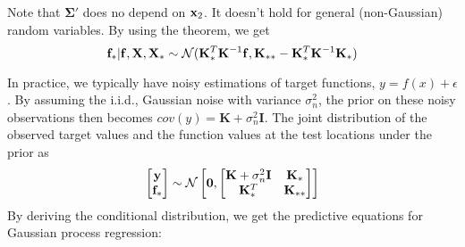 Note that $\mathbf{\Sigma}'$ does no depend on ${\mathbf{x}}_2$. It doesn't hold for general (non-Gaussian) random variables.
By using the theorem, we get
$${\mathbf{f}}_*|{\mathbf{f}}, \mathbf{X}, \mathbf{X}_*\sim \mathcal{N}(\mathbf{K}_*^T\mathbf{K}^{-1}{\mathbf{f}}, \mathbf{K}_{**}-\mathbf{K}_*^T\mathbf{K}^{-1}\mathbf{K}_{*})$$

In practice, we typically have noisy estimations of target functions, $y = f(x)+\epsilon$. By assuming the i.i.d., Gaussian noise with variance $\sigma_n^2$, the prior on these noisy observations then becomes $cov(y) = \mathbf{K}+\sigma_n^2\mathbf{I}$. The joint distribution of the observed target values and the function values at the test locations under the prior as 
\begin{align*}
	\begin{bmatrix}
		{\mathbf{y}}\\
		{\mathbf{f}}_*
	\end{bmatrix} \sim \mathcal{N}
	\begin{bmatrix}
		\mathbf{0}, \begin{bmatrix}
			\mathbf{K}+\sigma_n^2\mathbf{I} & \mathbf{K}_*\\
			\mathbf{K}_*^T & \mathbf{K}_{**}
		\end{bmatrix}
	\end{bmatrix}
\end{align*}
By deriving the conditional distribution, we get the predictive equations for Gaussian process regression:






